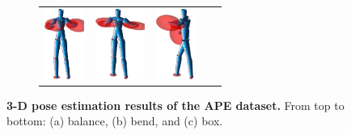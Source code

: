 \begin{figure}
\begin{subfigure}[b]{1\linewidth}
\begin{tabular}{c|cccc}
			\includegraphics[height=2.3cm]{fig/body/APE/boxx2.png} &
			\includegraphics[height=2.3cm]{fig/body/APE/boxx3.png} & 
			\includegraphics[height=2.3cm]{fig/body/APE/boxx4.png} 
		\end{tabular}
		\label{fig/body/APE/boxx} 
	\end{subfigure}
	\caption{\textbf{3-D pose estimation results of the APE dataset.} From top to bottom: (a) balance, (b) bend, and (c) box.}
	\label{fig/body/APE1}
\end{figure}

